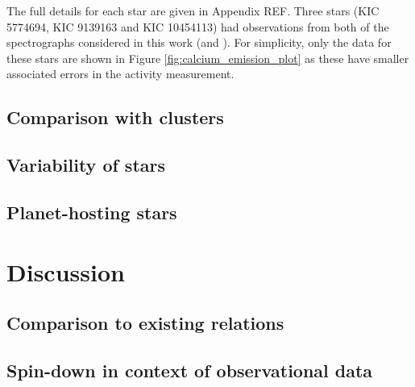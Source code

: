 The full details for each star are given in Appendix REF. Three stars (KIC 5774694, KIC 9139163 and KIC 10454113) had observations from both of the spectrographs considered in this work (\esp and \narval). For simplicity, only the \narval data for these stars are shown in Figure \ref{fig:calcium_emission_plot} as these have smaller associated errors in the activity measurement. 




\subsection{Comparison with clusters}









\subsection{Variability of stars}









\subsection{Planet-hosting stars}









\section{Discussion}
\label{Chp4_discussion}

\subsection{Comparison to existing relations}







\subsection{Spin-down in context of observational data}









